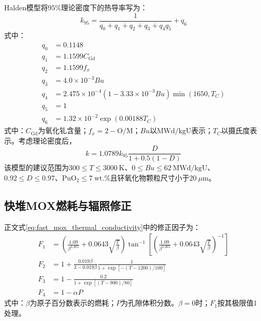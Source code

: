 Halden模型将$95\%$理论密度下的热导率写为：
\begin{equation}
	k_{95}=
	\frac{1}{q_0+q_1+q_2+q_3+q_4q_5}+q_6
	\label{eq:appendix_halden_k95}
\end{equation}
\noindent 式中：
\begin{equation}
	\begin{aligned}
		q_0&=0.1148\\
		q_1&=1.1599C_{\mathrm{Gd}}\\
		q_2&=1.1599f_x\\
		q_3&=4.0\times10^{-3}Bu\\
		q_4&=2.475\times10^{-4}
		\left(1-3.33\times10^{-3}Bu\right)
		\min(1650,T_C)\\
		q_5&=1\\
		q_6&=1.32\times10^{-2}\exp(0.00188T_C)
	\end{aligned}
	\label{eq:appendix_halden_terms}
\end{equation}
\label{eq:appendix_halden_q0}
\label{eq:appendix_halden_q1}
\label{eq:appendix_halden_q2}
\label{eq:appendix_halden_q3}
\label{eq:appendix_halden_q4}
\label{eq:appendix_halden_q5}
\label{eq:appendix_halden_q6}
\noindent 式中：$C_{\mathrm{Gd}}$为氧化钆含量；$f_x=2-\mathrm{O/M}$；$Bu$以$\mathrm{MWd/kgU}$表示；$T_C$以摄氏度表示。考虑理论密度后，
\begin{equation}
	k=1.0789k_{95}\frac{D}{1+0.5(1-D)}
	\label{eq:appendix_halden_density_correction}
\end{equation}
该模型的建议范围为$300\leq T\leq3000\ \mathrm{K}$、$0\leq Bu\leq62\ \mathrm{MWd/kgU}$、$0.92\leq D\leq0.97$、$\mathrm{PuO}_2\leq7\ \mathrm{wt.\%}$且钚氧化物颗粒尺寸小于$20\ \mu\mathrm{m}$。

\subsection{快堆MOX燃耗与辐照修正}

正文式\eqref{eq:fast_mox_thermal_conductivity}中的修正因子为：
\begin{equation}
	\begin{aligned}
		F_1&=
		\left(
		\frac{1.09}{\beta^{3.265}}
		+0.0643\sqrt{\frac{T}{\beta}}
		\right)
		\tan^{-1}\!\left[
		\left(
		\frac{1.09}{\beta^{3.265}}
		+0.0643\sqrt{\frac{T}{\beta}}
		\right)^{-1}
		\right]
		\\
		F_2&=1+
		\frac{0.019\beta}{3-0.019\beta}
		\frac{1}{1+\exp[-(T-1200)/100]}
		\\
		F_3&=1-
		\frac{0.2}{1+\exp[(T-900)/80]}
		\\
		F_4&=1-\alpha P
	\end{aligned}
	\label{eq:appendix_fast_mox_correction_factors}
\end{equation}
\label{eq:appendix_fast_mox_F1}
\label{eq:appendix_fast_mox_F2}
\label{eq:appendix_fast_mox_F3}
\label{eq:appendix_fast_mox_F4}
\noindent 式中：$\beta$为原子百分数表示的燃耗；$P$为孔隙体积分数。$\beta=0$时；$F_1$按其极限值1处理。


